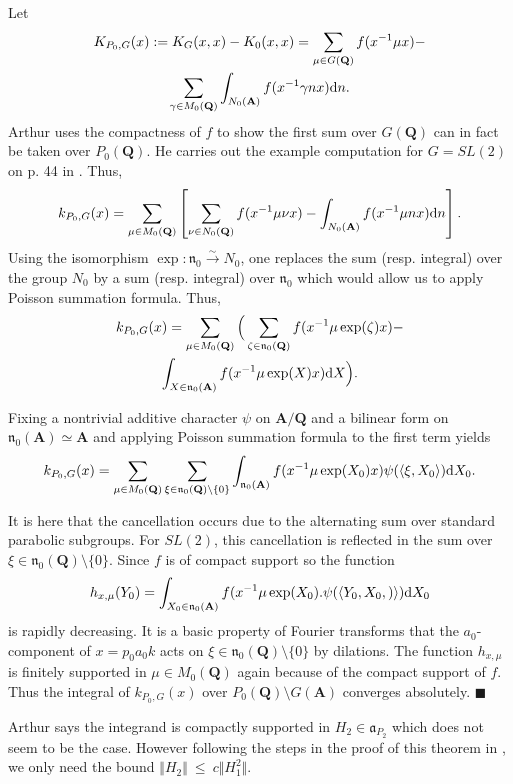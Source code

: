 \documentclass{ims9x6}
\def\A{\mathbf A}
\def\Q{\mathbf Q}
\def\aaa{\mathfrak a}
\def\d{\text d}
\def\bs{\setminus}
\def\norm#1{\Vert #1 \Vert} %
\def\nnn{\mathfrak n}
\def\sprod#1#2{\left\langle #1 , #2 \right\rangle}  %
\begin{document}
Let 
\begin{multline*}
	K_{P_0, G}(x) := K_G(x, x) - K_0(x, x) 
			= \sum_{\mu \in G(\Q)} f(x^{-1}\mu x) - \\ \sum_{\gamma \in M_0(\Q)} \int_{N_0(\A)} 
				f(x^{-1} \gamma n x) \d n.
\end{multline*}
Arthur uses the compactness of $f$ to show the first sum over $G(\Q)$ can in fact be taken over $P_0(\Q)$. He carries out the example computation for $G = SL(2)$ on p. 44 in \cite{clay}. Thus, 
\[ k_{P_0, G}(x) = \sum_{\mu \in M_0(\Q)} \left[\sum_{\nu \in N_0(\Q)} f(x^{-1} \mu \nu x) -
		\int_{N_0(\A)} f(x^{-1} \mu n x) \d n \right]. \]
Using the isomorphism $\exp : \nnn_0 \xrightarrow{\sim} N_0$, one replaces the sum (resp. integral) over the group $N_0$ by a sum (resp. integral) over $\nnn_0$ which would allow us to apply Poisson summation formula. Thus,
\begin{multline*}
k_{P_0, G}(x) = \sum_{\mu \in M_0(\Q)} \Big( \sum_{\zeta \in \nnn_0(\Q)} f(x^{-1} \mu \exp(\zeta) x) - \\
	\int_{X \in \nnn_0(\A)} f(x^{-1} \mu \exp(X) x) \d X \Big).
\end{multline*}

Fixing a nontrivial additive character $\psi$ on $\A/\Q$ and a bilinear form on $\nnn_0(\A) \simeq \A$ and applying Poisson summation formula to the first term yields
\[ k_{P_0, G}(x) = \sum_{\mu \in M_0(\Q)} \sum_{\xi \in \nnn_0(\Q) \bs \{0 \}} \int_{\nnn_0(\A)}
		f(x^{-1} \mu \exp(X_0) x) \psi(\sprod{\xi}{X_0}) \d X_0.
\]

It is here that the cancellation occurs due to the alternating sum over standard parabolic subgroups. For $SL(2)$, this cancellation is reflected in the sum over $\xi \in \nnn_0(\Q) \bs \{0\}$. Since $f$ is of compact support so the function
\[ h_{x, \mu}(Y_0) = \int_{X_0 \in \nnn_0(\A)} f(x^{-1} \mu \exp(X_0) . \psi(\sprod{Y_0, X_0})) \d X_0 \]
is rapidly decreasing. It is a basic property of Fourier transforms that the $a_0$-component of $x = p_0 a_0 k$ acts on $\xi \in \nnn_0(\Q) \bs \{0\}$ by dilations. The function $h_{x, \mu}$ is finitely supported in $\mu \in M_0(\Q)$ again because of the compact support of $f$. Thus the integral of $k_{P_0, G}(x)$ over $P_0(\Q)\bs G(\A)$ converges absolutely. $\blacksquare$

\begin{remark}
	Arthur says the integrand is compactly supported in $H_2 \in \aaa_{P_2}$ which does not seem to be the case. However following the steps in the proof of this theorem in \cite[p.~947]{duke}, we only need the bound $\norm{H_2}~\leq~c\norm{H_1^2}$. 
\end{remark}
\end{document}
